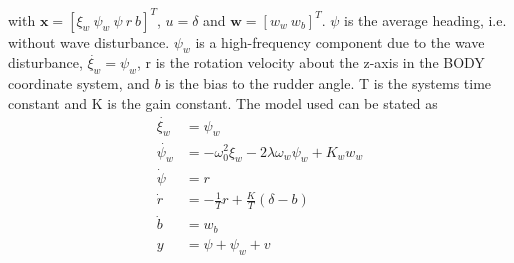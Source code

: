 with $\textbf{x} = [\xi_w \ \psi_w \ \psi \ r \ b]^T$, $u = \delta$ and $\textbf{w} = [w_w \ w_b]^T$. $\psi$ is the average heading, i.e. without wave disturbance. $\psi_w$ is a high-frequency component due to the wave disturbance, $\dot{\xi_w} = \psi_w$, r is the rotation velocity about the z-axis in the BODY coordinate system, and $b$ is the bias to the rudder angle. T is the systems time constant and K is the gain constant. The model used can be stated as 
\begin{subequations}
\begin{align}
        \dot{\xi_w} &= \psi_w \label{eq:xidot_def} \\
        \dot{\psi_w} &= -\omega_0^2 \xi_w - 2\lambda \omega_w \psi_w + K_w w_w \label{eq:psidot_m} \\
        \dot{\psi} &= r \label{eq:psidot} \\
        \dot{r} &= -\frac{1}{T}r + \frac{K}{T}(\delta - b) \label{eq:rdot_def} \\
        \dot{b} &= w_b \label{eq:b_def} \\
        y &= \psi + \psi_w + v \label{eq:y_def}
\end{align}
\end{subequations}
